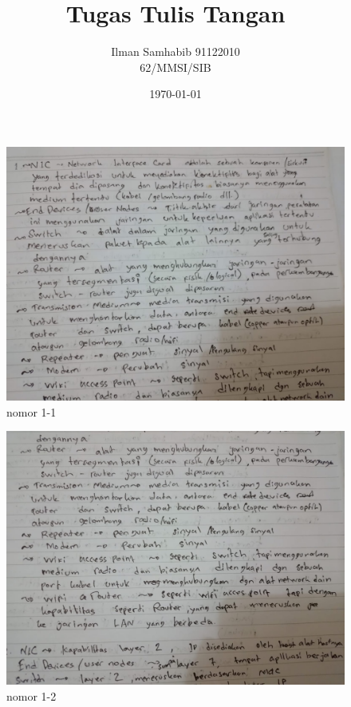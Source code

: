 \documentclass{article}
\title{Tugas Tulis Tangan}
\author{Ilman Samhabib 91122010\\62/MMSI/SIB}
\date{\today}
\begin{document}
\maketitle
\begin{figure}
    \centering
    \includegraphics[width=\textwidth]{1-1.jpeg}
    \caption{nomor 1-1}
  \end{figure}
  \begin{figure}
    \centering
    \includegraphics[width=\textwidth]{1-2.jpeg}
    \caption{nomor 1-2}
  \end{figure}
\end{document}
